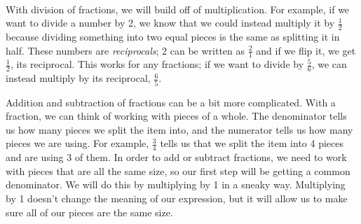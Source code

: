 \\

With division of fractions, we will build off of multiplication. For example, if we want to divide a number by 2, we know that we could instead multiply it by $\frac{1}{2}$ because dividing something into two equal pieces is the same as splitting it in half. These numbers are \emph{reciprocals}; 2 can be written as $\frac{2}{1}$ and if we flip it, we get $\frac{1}{2}$, its reciprocal. This works for any fractions; if we want to divide by $\frac{5}{6}$, we can instead multiply by its reciprocal, $\frac{6}{5}$.

Addition and subtraction of fractions can be a bit more complicated. With a fraction, we can think of working with pieces of a whole. The denominator tells us how many pieces we split the item into, and the numerator tells us how many pieces we are using. For example, $\frac{3}{4}$ tells us that we split the item into 4 pieces and are using 3 of them. In order to add or subtract fractions, we need to work with pieces that are all the same size, so our first step will be getting a common denominator. We will do this by multiplying by 1 in a sneaky way. Multiplying by 1 doesn't change the meaning of our expression, but it will allow us to make sure all of our pieces are the same size.

